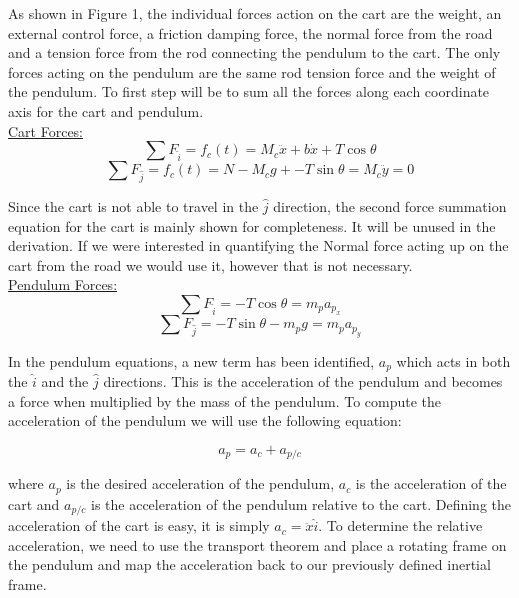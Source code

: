 \documentclass[titlepage]{article}
\begin{document}
As shown in Figure 1, the individual forces action on the cart are the weight, an external control force, a friction damping force, the normal force from the road and a tension force from the rod connecting the pendulum to the cart. The only forces acting on the pendulum are the same rod tension force and the weight of the pendulum. To first step will be to sum all the forces along each coordinate axis for the cart and pendulum.\\

\underline{Cart Forces:}
\begin{equation}
\sum{}{F_{\hat{i}}} = f_{c}\left(t\right) = M_{c}\ddot{x} + b\dot{x} + T\cos{\theta}
\end{equation}
\[ \sum{}{F_{\hat{j}}} = f_{c}\left(t\right) = N - M_{c}g + - T\sin{\theta} = M_{c}\ddot{y}=0 \]

Since the cart is not able to travel in the \(\hat{j}\) direction, the second force summation equation for the cart is mainly shown for completeness. It will be unused in the derivation. If we were interested in quantifying the Normal force acting up on the cart from the road we would use it, however that is not necessary.\\

\underline{Pendulum Forces:}
\[ \sum{}{F_{\hat{i}}} = -T\cos{\theta} = m_{p}a_{p_{x}}\]
\[ \sum{}{F_{\hat{j}}} =  -T\sin{\theta} -m_{p}g = m_{p}a_{p_{y}} \]

In the pendulum equations, a new term has been identified, \(a_{p}\) which acts in both the \(\hat{i}\) and the \(\hat{j}\) directions. This is the acceleration of the pendulum and becomes a force when multiplied by the mass of the pendulum. To compute the acceleration of the pendulum we will use the following equation:

\[a_p = a_c + a_{p/c}\]

where \(a_p\) is the desired acceleration of the pendulum, \(a_c\) is the acceleration of the cart and \(a_{p/c}\) is the acceleration of the pendulum relative to the cart. Defining the acceleration of the cart is easy, it is simply \(a_c=\ddot{x}\hat{i}\). To determine the relative acceleration, we need to use the transport theorem and place a rotating frame on the pendulum and map the acceleration back to our previously defined inertial frame.
\end{document}

